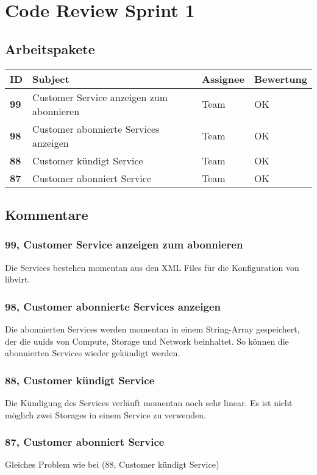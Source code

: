 
\chapter{Code Review Sprint 1}
\section{Arbeitspakete}

\begin{center}

\begin{tabularx}{\linewidth}{l l l l}
\textbf{ID} & \textbf{Subject} & \textbf{Assignee} & \textbf{Bewertung}\\
\hline
\textbf{99} & Customer Service anzeigen zum abonnieren & Team & OK \\
\textbf{98} & Customer abonnierte Services anzeigen & Team & OK\\
\textbf{88} & Customer kündigt Service & Team & OK\\
\textbf{87} & Customer abonniert Service & Team & OK\\
\end{tabularx}

\end{center}
\newpage

\section{Kommentare}

\subsection{99, Customer Service anzeigen zum abonnieren}
Die Services bestehen momentan aus den XML Files für die Konfiguration von libvirt.\\

\subsection{98, Customer abonnierte Services anzeigen}
Die abonnierten Services werden momentan in einem String-Array gespeichert, der die uuids von Compute, Storage und Network beinhaltet. So können die abonnierten Services wieder gekündigt werden.

\subsection{88, Customer kündigt Service}
Die Kündigung des Services verläuft momentan noch sehr linear. Es ist nicht möglich zwei Storages in einem Service zu verwenden. 
\\

\subsection{87, Customer abonniert Service}
Gleiches Problem wie bei (88, Customer kündigt Service)\\
